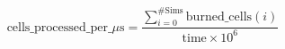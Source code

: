 \documentclass[border=2pt]{standalone}
\begin{document}
\[
\text{cells\_processed\_per\_}\mu\text{s} = \frac{\sum\limits_{i=0}^{\#\text{Sims}} \text{burned\_cells}(i)}{\text{time} \times 10^6}
\]
\end{document}
